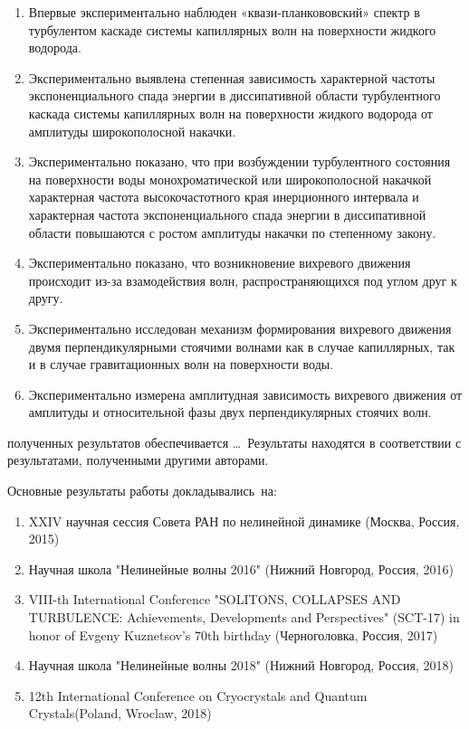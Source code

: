 {}
\begin{enumerate}
	\item Впервые экспериментально наблюден «квази-планкововский» спектр в турбулентом каскаде системы капиллярных волн на поверхности жидкого водорода.
	\item Экспериментально выявлена степенная зависимость характерной частоты экспоненциального спада энергии в диссипативной области турбулентного каскада системы капиллярных волн на поверхности жидкого водорода от амплитуды широкополосной накачки.
	\item Экспериментально показано, что при возбуждении турбулентного состояния на поверхности воды монохроматической или широкополосной накачкой характерная частота высокочастотного края инерционного интервала и характерная частота экспоненциального спада энергии в диссипативной области повышаются с ростом амплитуды накачки по степенному закону.
	\item Экспериментально показано, что возникновение вихревого движения происходит из-за взамодействия волн, распространяющихся под углом друг к другу.
	\item Экспериментально исследован механизм формирования вихревого движения двумя перпендикулярными стоячими волнами как в случае капиллярных, так и в случае гравитационных волн на поверхности воды.
	\item Экспериментально измерена амплитудная зависимость вихревого движения от амплитуды и относительной фазы двух перпендикулярных стоячих волн.

\end{enumerate}


{\reliability} полученных результатов обеспечивается \ldots \ Результаты находятся в соответствии с результатами, полученными другими авторами.


{\probation}
Основные результаты работы докладывались~на:
\begin{enumerate}
	\item XXIV научная сессия Совета РАН по нелинейной динамике (Москва, Россия, 2015)
	\item Научная школа "Нелинейные волны 2016" (Нижний Новгород, Россия, 2016)
	\item VIII-th International Conference "SOLITONS, COLLAPSES AND TURBULENCE: Achievements, Developments and Perspectives" (SCT-17) in honor of Evgeny Kuznetsov's 70th birthday (Черноголовка, Россия, 2017)
	\item Научная школа "Нелинейные волны 2018" (Нижний Новгород, Россия, 2018)
	\item 12th International Conference on Cryocrystals and Quantum Crystals(Poland, Wroclaw, 2018)
\end{enumerate}


